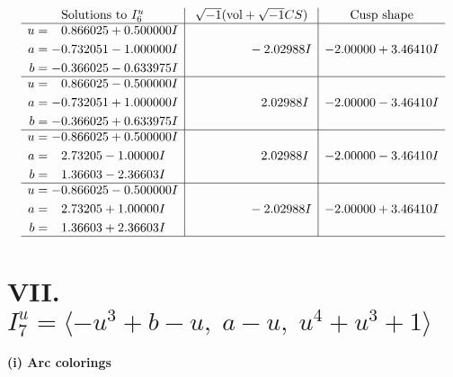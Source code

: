 \documentclass[1p]{elsarticle_modified}
\theoremstyle{definition}
\newcommand{\I}{\sqrt{-1}}
\begin{document}
$$\begin{array}{c|c|c}  
\text{Solutions to }I^u_{6}& \I (\text{vol} + \sqrt{-1}CS) & \text{Cusp shape}\\
 \hline 
\begin{aligned}
u &= \phantom{-}0.866025 + 0.500000 I \\
a &= -0.732051 - 1.000000 I \\
b &= -0.366025 - 0.633975 I\end{aligned}
 & \phantom{-0.000000 } -2.02988 I & -2.00000 + 3.46410 I \\ \hline\begin{aligned}
u &= \phantom{-}0.866025 - 0.500000 I \\
a &= -0.732051 + 1.000000 I \\
b &= -0.366025 + 0.633975 I\end{aligned}
 & \phantom{-0.000000 -}2.02988 I & -2.00000 - 3.46410 I \\ \hline\begin{aligned}
u &= -0.866025 + 0.500000 I \\
a &= \phantom{-}2.73205 - 1.00000 I \\
b &= \phantom{-}1.36603 - 2.36603 I\end{aligned}
 & \phantom{-0.000000 -}2.02988 I & -2.00000 - 3.46410 I \\ \hline\begin{aligned}
u &= -0.866025 - 0.500000 I \\
a &= \phantom{-}2.73205 + 1.00000 I \\
b &= \phantom{-}1.36603 + 2.36603 I\end{aligned}
 & \phantom{-0.000000 } -2.02988 I & -2.00000 + 3.46410 I\\
 \hline 
 \end{array}$$\newpage\newpage\renewcommand{\arraystretch}{1}
\centering \section*{VII. $I^u_{7}= \langle - u^3+b- u,\;a- u,\;u^4+u^3+1 \rangle$}
\flushleft \textbf{(i) Arc colorings}\\
\end{document}
